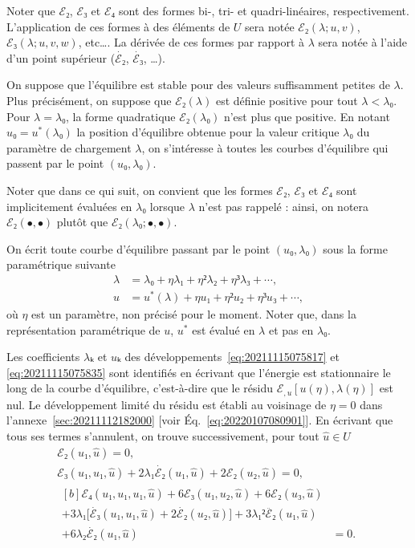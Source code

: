 \documentclass[12pt, final]{amsart}
\begin{document}
Noter que \(ℰ₂\), \(ℰ₃\) et \(ℰ₄\) sont des formes bi-, tri- et quadri-linéaires,
respectivement. L'application de ces formes à des éléments de \(U\) sera notée
\(ℰ₂(λ; u, v)\), \(ℰ₃(λ; u, v, w)\), etc\dots. La dérivée de ces formes par
rapport à \(λ\) sera notée à l'aide d'un point supérieur (\(\dot{ℰ₂}\),
\(\dot{ℰ₃}\), \dots).

On suppose que l'équilibre est stable pour des valeurs suffisamment petites de
\(λ\). Plus précisément, on suppose que \(ℰ₂(λ)\) est définie positive pour tout
\(λ<λ₀\). Pour \(λ=λ₀\), la forme quadratique \(ℰ₂(λ₀)\) n'est plus que
positive. En notant \(u₀=u^*(λ₀)\) la position d'équilibre obtenue pour la
valeur critique \(λ₀\) du paramètre de chargement \(λ\), on s'intéresse à
toutes les courbes d'équilibre qui passent par le point \((u₀, λ₀)\).

Noter que dans ce qui suit, on convient que les formes \(ℰ₂\), \(ℰ₃\) et \(ℰ₄\)
sont implicitement évaluées en \(λ₀\) lorsque \(λ\) n'est pas rappelé : ainsi,
on notera \(ℰ₂(•, •)\) plutôt que \(ℰ₂(λ₀; •, •)\).

On écrit toute courbe d'équilibre passant par le point \((u₀, λ₀)\) sous la
forme paramétrique suivante
\begin{align}
  \label{eq:20211115075817}
  λ&=λ₀+ηλ₁+η²λ₂+η³λ₃+\cdots,\\
  \label{eq:20211115075835}
  u&=u^*(λ)+η u₁+η² u₂+η³u₃+\cdots,
\end{align}
où \(η\) est un paramètre, non précisé pour le moment. Noter que, dans la
représentation paramétrique de \(u\), \(u^*\) est évalué en \(λ\) et pas en
\(λ₀\).

Les coefficients \(λ ₖ\) et \(uₖ\) des développements~\eqref{eq:20211115075817}
et \eqref{eq:20211115075835} sont identifiés en écrivant que l'énergie est
stationnaire le long de la courbe d'équilibre, c'est-à-dire que le résidu
\(ℰ_{,u}[u(η), λ(η)]\) est nul. Le développement limité du résidu est établi au
voisinage de \(η=0\) dans l'annexe~\ref{sec:20211112182000} [voir
Éq.~\eqref{eq:20220107080901}]. En écrivant que tous ses termes s'annulent, on
trouve successivement, pour tout \(\hat{u}∈ U\)
\begin{gather}
  \label{eq:20211112182917}
  ℰ₂(u₁, \hat{u})=0,\\
  \label{eq:20211112183220}
  ℰ₃(u₁, u₁, \hat{u})+2λ₁\dot{ℰ₂}(u₁, \hat{u})+2ℰ₂(u₂, \hat{u})=0,\\
  \label{eq:20220114135717}
  \begin{aligned}[b]
    ℰ₄(u₁, u₁, u₁, \hat{u})+6ℰ₃(u₁, u₂, \hat{u})+6ℰ₂(u₃, \hat{u})&\\
    +3λ₁\bigl[\dot{ℰ₃}(u₁, u₁, \hat{u})+2\dot{ℰ₂}(u₂, \hat{u})\bigr]
    +3λ₁²\ddot{ℰ₂}(u₁, \hat{u})&\\
    +6λ₂\dot{ℰ₂}(u₁, \hat{u})&=0.
  \end{aligned}
\end{gather}
\end{document}
